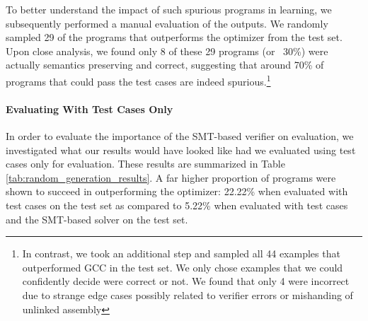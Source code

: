\documentclass{article}
\def\correctfuncio/{\ensuremath{\mathcal{D}_\textrm{I/O}}}
\begin{document}
To better understand the impact of such spurious programs in learning, 
we subsequently performed a manual evaluation of the outputs. 
We randomly sampled 29 of the programs that outperforms the optimizer from the test set. 
Upon close analysis, we found only 8 of these 29 programs (or ~30\%) were actually semantics preserving and correct, suggesting that around 70\% of programs that could pass the test cases are indeed spurious.\footnote{In contrast, we took an additional step and sampled all 44 examples that outperformed GCC in the test set. We only chose examples that we could confidently decide were correct or not. We found that only 4 were incorrect due to strange edge cases possibly related to verifier errors or mishanding of unlinked assembly}


\paragraph{Evaluating With Test Cases Only} In order to evaluate the importance of the SMT-based verifier on evaluation, we investigated what our results would have looked like had we evaluated using test cases only for evaluation. These results are summarized in Table \ref{tab:random_generation_results}. A far higher proportion of programs were shown to succeed in outperforming the optimizer: 22.22\% when evaluated with test cases on the test set as compared to 5.22\% when evaluated with test cases and the SMT-based solver on the test set. 


\end{document}

